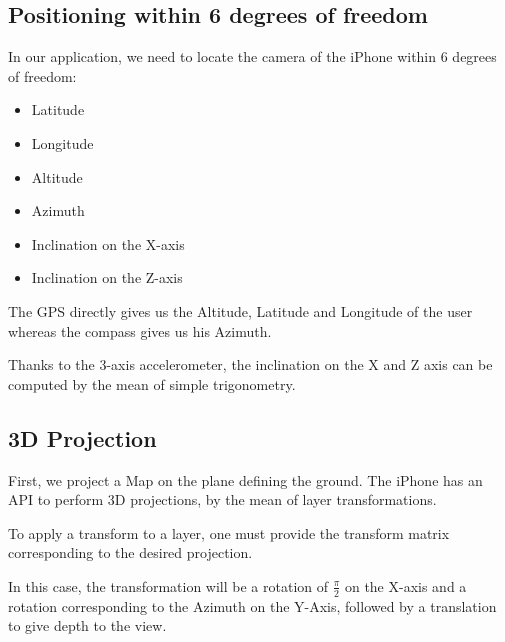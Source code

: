 \subsection{Positioning within 6 degrees of freedom}

In our application, we need to locate the camera of the iPhone within 6 degrees of freedom:

\begin{itemize}
\item{Latitude}
\item{Longitude}
\item{Altitude}
\item{Azimuth}
\item{Inclination on the X-axis}
\item{Inclination on the Z-axis}
\end{itemize}

The GPS directly gives us the Altitude, Latitude and Longitude of the user whereas the compass gives us his Azimuth.

Thanks to the 3-axis accelerometer, the inclination on the X and Z axis can be computed by the mean of simple trigonometry.

\subsection{3D Projection}

First, we project a Map on the plane defining the ground. The iPhone has an API to perform 3D projections, by the mean of layer transformations.

To apply a transform to a layer, one must provide the transform matrix corresponding to the desired projection.

In this case, the transformation will be a rotation of $\frac{\pi}{2}$ on the X-axis and a rotation corresponding to the Azimuth on the Y-Axis, followed by a translation to give depth to the view.
